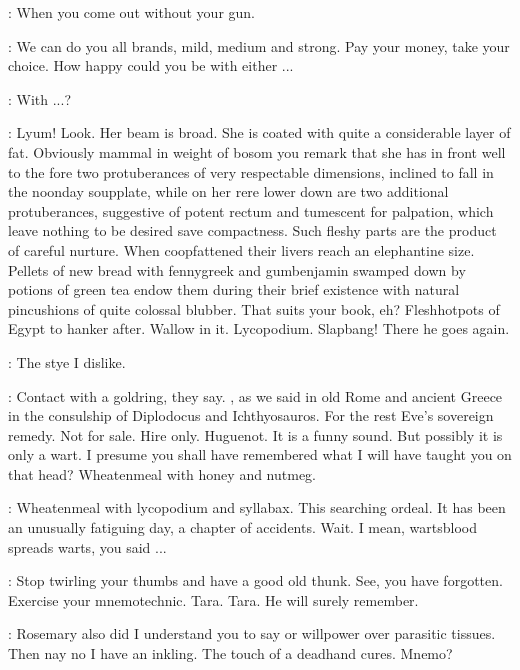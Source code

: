 \Bloom:
When you come out without your gun.

\Virag:
We can do you all brands, mild, medium and strong.
Pay your money, take your choice.
How happy could you be with either ...

\Bloom:
With ...?

\Virag:
Lyum! Look.
Her beam is broad.
She is coated with quite a considerable layer of fat.
Obviously mammal in weight of bosom
you remark that she has in front well to the fore
two protuberances of very respectable dimensions,
inclined to fall in the noonday soupplate,
while on her rere lower down are two additional protuberances,
suggestive of potent rectum and tumescent for palpation,
which leave nothing to be desired save compactness.
Such fleshy parts are the product of careful nurture.
When coopfattened their livers reach an elephantine size.
Pellets of new bread with fennygreek and gumbenjamin
swamped down by potions of green tea endow them during
their brief existence with natural pincushions of quite colossal blubber.
That suits your book, eh?
Fleshhotpots of Egypt to hanker after.
Wallow in it.
Lycopodium.
Slapbang!
There he goes again.

\Bloom:
The stye I dislike.

\Virag:
Contact with a goldring, they say.
,
as we said in old Rome and ancient Greece
in the consulship of Diplodocus and Ichthyosauros.
For the rest Eve's sovereign remedy.
Not for sale.
Hire only.
Huguenot.
It is a funny sound.
But possibly it is only a wart.
I presume you shall have remembered what I will have taught you on that head?
Wheatenmeal with honey and nutmeg.

\Bloom:
Wheatenmeal with lycopodium and syllabax.
This searching ordeal.
It has been an unusually fatiguing day, a chapter of accidents.
Wait.
I mean, wartsblood spreads warts, you said ...

\Virag:
Stop twirling your thumbs and have a good old thunk.
See, you have forgotten.
Exercise your mnemotechnic.
Tara. Tara.
He will surely remember.

\Bloom:
Rosemary also did I understand you to say or willpower over parasitic tissues.
Then nay no I have an inkling.
The touch of a deadhand cures.
Mnemo?%

